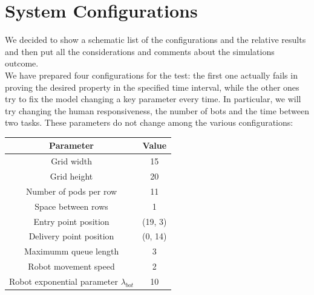 \documentclass{article}
\begin{document}
	\section{System Configurations}
		We decided to show a schematic list of the configurations and the relative results and then put all the considerations and comments about the simulations outcome.\\
		We have prepared four configurations for the test: the first one actually fails in proving the desired property in the specified time interval, while the other ones try to fix the model changing a key parameter every time. In particular, we will try changing the human responsiveness, the number of bots and the time between two tasks.
		These parameters do not change among the various configurations:
		\begin{center}
			\begin{tabular}{ |c|c|}
				\hline
				Parameter & Value \\
				\hline
				\hline
				Grid width & 15\\
				\hline
				Grid height & 20\\
				\hline
				Number of pods per row & 11\\
				\hline
				Space between rows & 1 \\
				\hline
				Entry point position & (19, 3) \\
				\hline
				Delivery point position & (0, 14) \\
				\hline
				Maximumm queue length & 3 \\
				\hline
				Robot movement speed & 2 \\
				\hline
				Robot exponential parameter $\lambda_{bot}$ & 10 \\
				\hline
			\end{tabular}
		\end{center}
			
\end{document}
